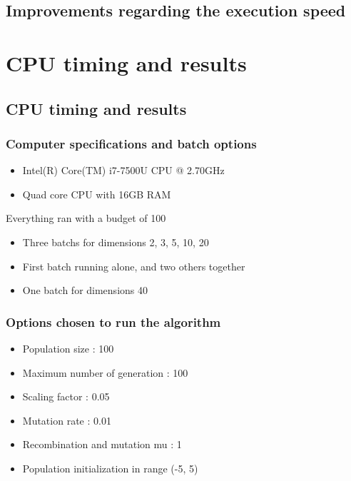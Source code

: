 \documentclass{beamer}
\begin{document}
\subsection{Improvements regarding the execution speed}
\begin{frame}

\end{frame}

\section{CPU timing and results}
\subsection{CPU timing and results}
\begin{frame}
  \frametitle{Computer specifications and batch options}
  \begin{itemize}
  \item Intel(R) Core(TM) i7-7500U CPU @ 2.70GHz
  \item Quad core CPU with 16GB RAM
  \end{itemize}
  \vspace{1em}
  Everything ran with a budget of 100\\
  \begin{itemize}
  \item Three batchs for dimensions 2, 3, 5, 10, 20
  \item First batch running alone, and two others together
  \item One batch for dimensions 40
  \end{itemize}
\end{frame}

\begin{frame}
  \frametitle{Options chosen to run the algorithm}
  \begin{itemize}
  \item Population size : 100
  \item Maximum number of generation : 100
  \item Scaling factor : 0.05
  \item Mutation rate : 0.01
  \item Recombination and mutation mu : 1
  \item Population initialization in range (-5, 5)
  \end{itemize}
\end{frame}
\end{document}
